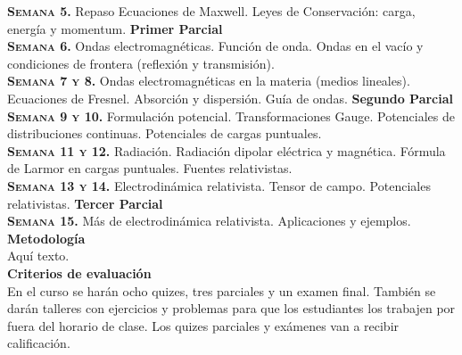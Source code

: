 \documentclass[letterpaper,10pt,onecolumn]{article}
\begin{document}
\noindent\textbf{\textsc{Semana 5.}} Repaso Ecuaciones de
Maxwell. Leyes de Conservaci\'on: carga, energ\'ia y
momentum. {\textbf{Primer Parcial}}\\[-0.3cm]  

\noindent\textbf{\textsc{Semana 6.}} Ondas
electromagn\'eticas. Funci\'on de onda. Ondas en el vac\'io y
condiciones de frontera (reflexi\'on y transmisi\'on).\\[-0.3cm]  

\noindent\textbf{\textsc{Semana 7 y 8.}} Ondas electromagn\'eticas en
la materia (medios lineales). Ecuaciones de Fresnel. Absorci\'on y
dispersi\'on. Gu\'ia de ondas. {\textbf{Segundo Parcial}}\\[-0.3cm] 

\noindent\textbf{\textsc{Semana 9 y 10.}} Formulaci\'on
potencial. Transformaciones Gauge. Potenciales de distribuciones
continuas. Potenciales de cargas puntuales. \\[-0.3cm] 

\noindent\textbf{\textsc{Semana 11 y 12.}} Radiaci\'on. Radiaci\'on
dipolar el\'ectrica y magn\'etica. F\'ormula de Larmor en cargas
puntuales. Fuentes relativistas.\\[-0.3cm] 

\noindent\textbf{\textsc{Semana 13 y 14.}} Electrodin\'amica
relativista. Tensor de campo. Potenciales
relativistas. {\textbf{Tercer Parcial}}\\[-0.3cm] 

\noindent\textbf{\textsc{Semana 15.}} M\'as de electrodin\'amica
relativista. Aplicaciones y ejemplos. \\[-0.1cm] 


\noindent\textbf{\large {} \quad
  Metodolog\'ia}\\[-0.2cm] 


\noindent\normalsize Aqu\'i texto.\\[0.1cm]

\noindent\textbf{\large {} \quad Criterios de
  evaluaci\'on}\\[-0.2cm] 

En el curso se har\'an ocho quizes, tres parciales y un examen
final. Tambi\'en se dar\'an talleres con ejercicios y problemas para
que los estudiantes los trabajen por fuera del horario de
clase. Los quizes parciales y ex\'amenes van a recibir
calificaci\'on. 
\end{document}
